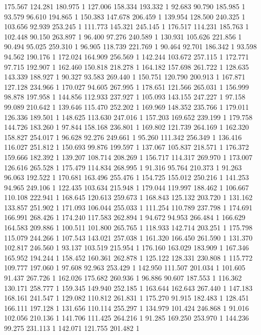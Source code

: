 	175.567	124.281	180.975	1
	127.006	158.334	193.332	1
	92.683	90.790	185.985	1
	93.579	96.610	194.865	1
	150.383	147.678	206.459	1
	139.954	128.500	240.325	1
	103.656	92.939	253.245	1
	111.773	145.321	245.145	1
	176.517	114.231	185.763	1
	102.448	90.150	263.897	1
	96.400	97.276	240.589	1
	130.931	105.626	221.856	1
	90.494	95.025	259.310	1
	96.905	118.739	221.769	1
	90.464	92.701	186.342	1
	93.598	94.562	190.176	1
	172.024	164.909	256.569	1
	142.244	103.672	257.115	1
	172.771	97.715	192.907	1
	162.460	150.818	218.278	1
	164.182	157.698	261.722	1
	128.635	143.339	188.927	1
	90.327	93.583	269.440	1
	150.751	120.790	200.913	1
	167.871	127.128	234.966	1
	170.027	94.605	267.995	1
	178.651	121.566	265.031	1
	156.999	98.878	197.958	1
	144.856	112.933	237.927	1
	105.093	143.155	247.227	1
	97.158	99.089	210.642	1
	139.646	115.470	252.202	1
	169.969	148.352	235.766	1
	179.011	126.336	189.501	1
	148.625	113.630	247.016	1
	157.203	169.652	239.199	1
	179.758	144.726	183.260	1
	97.844	158.168	236.801	1
	169.802	121.739	264.169	1
	162.320	158.827	254.017	1
	96.628	92.276	249.661	1
	95.260	111.342	256.349	1
	136.416	116.027	251.812	1
	150.693	99.876	199.597	1
	137.067	105.837	218.571	1
	176.372	159.666	182.392	1
	139.207	108.714	208.269	1
	156.717	114.317	269.970	1
	173.007	126.616	265.528	1
	175.479	114.834	268.995	1
	91.316	95.764	210.373	1
	91.263	96.063	192.522	1
	170.681	163.496	255.476	1
	154.725	155.012	250.216	1
	141.253	94.965	249.106	1
	122.435	103.634	215.948	1
	179.044	119.997	188.462	1
	106.667	110.108	222.941	1
	168.645	120.613	259.673	1
	168.843	125.132	203.720	1
	131.162	133.857	251.902	1
	171.093	106.044	255.033	1
	111.254	110.789	237.798	1
	174.691	166.991	268.426	1
	174.240	117.583	262.894	1
	94.672	94.953	266.484	1
	166.629	164.583	209.886	1
	100.511	101.800	265.765	1
	118.933	142.714	203.251	1
	175.798	115.079	244.266	1
	107.543	143.021	257.038	1
	161.320	166.450	261.590	1
	131.370	102.817	246.560	1
	93.137	103.519	215.954	1
	176.160	163.029	183.909	1
	167.346	165.952	194.244	1
	158.452	160.361	262.878	1
	125.122	128.331	230.808	1
	115.772	109.777	197.060	1
	97.608	92.963	253.429	1
	142.950	111.507	201.034	1
	101.605	91.437	267.726	1
	162.026	175.682	260.936	1
	96.886	90.607	187.553	1
	116.362	130.171	258.777	1
	159.345	149.940	252.185	1
	163.644	162.643	267.440	1
	147.183	168.161	241.547	1
	129.082	110.812	261.831	1
	175.270	91.915	182.483	1
	128.451	166.111	197.128	1
	131.656	110.114	255.297	1
	134.979	101.424	246.868	1
	91.016	102.056	210.136	1
	141.706	111.425	264.216	1
	91.285	169.250	253.970	1
	144.236	99.275	231.113	1
	142.071	121.755	201.482	1
